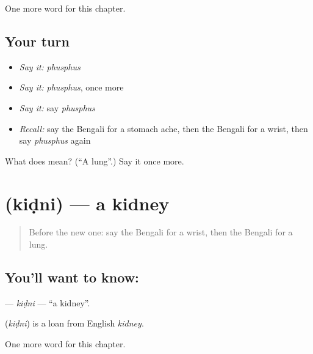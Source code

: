 \begin{grammarlens}[title={What you've built}]
One more word for this chapter.
\end{grammarlens}

\subsection*{Your turn}
\begin{itemize}
\raggedright
  \item \emph{Say it:} \emph{phusphus}
  \item \emph{Say it:} \emph{phusphus}, once more
  \item \emph{Say it:} say \emph{phusphus}
  \item \emph{Recall:} say the Bengali for a stomach ache, then the Bengali for a wrist, then say \emph{phusphus} again
\end{itemize}

\begin{tcolorbox}[breakable,colback=teal!4,colframe=teal!35!black,title={Before you move on}]
What does  mean? (\textquotedblleft{}A lung\textquotedblright{}.) Say it once more.
\end{tcolorbox}
\section[\texorpdfstring{\bn{কিডনি} (kiḍni)}{কিডনি (kiḍni)}]{ (kiḍni) — a kidney}

\label{lesson:BN-C155-kidni}



\begin{quote}
Before the new one: say the Bengali for a wrist, then the Bengali for a lung.
\end{quote}

\subsection*{You'll want to know: }
\textbf{} — \emph{kiḍni} — \textquotedblleft{}a kidney\textquotedblright{}.

\begin{cousinweb}
\textbf{} (\emph{kiḍni}) is a loan from English \emph{kidney}.
\end{cousinweb}

\begin{grammarlens}[title={What you've built}]
One more word for this chapter.
\end{grammarlens}

